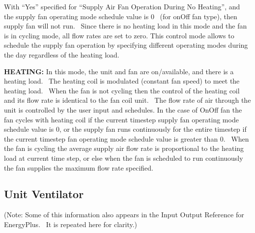 With ``Yes'' specified for ``Supply Air Fan Operation During No Heating'', and the supply fan operating mode schedule value is 0~ (for onOff fan type), then supply fan will not run.~ Since there is no heating load in this mode and the fan is in cycling mode, all flow rates are set to zero. This control mode allows to schedule the supply fan operation by specifying different operating modes during the day regardless of the heating load.

\textbf{HEATING:} In this mode, the unit and fan are on/available, and there is a heating load.~ The heating coil is modulated (constant fan speed) to meet the heating load.~ When the fan is not cycling then the control of the heating coil and its flow rate is identical to the fan coil unit.~ The flow rate of air through the unit is controlled by the user input and schedules. In the case of OnOff fan the fan cycles with heating coil if the current timestep supply fan operating mode schedule value is 0, or the supply fan runs continuously for the entire timestep if the current timestep fan operating mode schedule value is greater than 0.~ When the fan is cycling the average supply air flow rate is proportional to the heating load at current time step, or else when the fan is scheduled to run continuously the fan supplies the maximum flow rate specified.

\subsection{Unit Ventilator}\label{unit-ventilator}

(Note: Some of this information also appears in the Input Output Reference for EnergyPlus.~ It is repeated here for clarity.)

